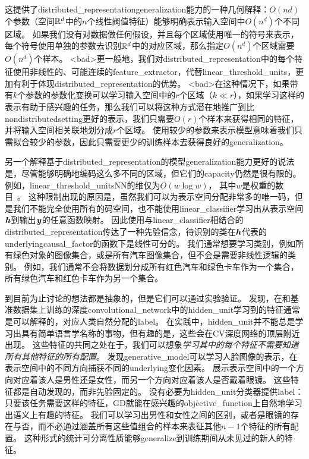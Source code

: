 这提供了\gls{distributed_representation}\gls{generalization}能力的一种几何解释：$O(nd)$个参数（空间$\mathbb{R}^d$中的$n$个线性阀值特征）能够明确表示输入空间中$O(n^d)$个不同区域。
如果我们没有对数据做任何假设，并且每个区域使用唯一的符号来表示，每个符号使用单独的参数去识别$\mathbb{R}^d$中的对应区域，那么指定$O(n^d)$个区域需要$O(n^d)$个样本。
<bad>更一般地，我们对\gls{distributed_representation}中的每个特征使用非线性的、可能连续的\gls{feature_extractor}，代替\gls{linear_threshold_units}，更加有利于体现\gls{distributed_representation}的优势。
<bad>在这种情况下，如果带有$k$个参数的参数化变换可以学习输入空间中的$r$个区域（$k\ll r$），如果学习这样的表示有助于感兴趣的任务，那么我们可以将这种方式潜在地推广到比\gls{nondistributed}\gls{setting}更好的表示，我们只需要$O(r)$个样本来获得相同的特征，并将输入空间相关联地划分成$r$个区域。
使用较少的参数来表示模型意味着我们只需拟合较少的参数，因此只需要更少的训练样本去获得良好的\gls{generalization}。

另一个解释基于\gls{distributed_representation}的模型\gls{generalization}能力更好的说法是，尽管能够明确地编码这么多不同的区域，但它们的\gls{capacity}仍然是很有限的。
例如，\gls{linear_threshold_units}\gls{NN}的维仅为$O(w\log w)$， 其中$w$是权重的数目~\citep{sontag1998vc}。
这种限制出现的原因是，虽然我们可以为表示空间分配非常多的唯一码，但是我们不能完全使用所有的码空间，也不能使用\gls{linear_classifier}学习出从表示空间$\boldsymbol{\mathit{h}}$到输出$\boldsymbol{\mathit{y}}$的任意函数映射。
因此使用与\gls{linear_classifier}相结合的\gls{distributed_representation}传达了一种先验信念，待识别的类在$\boldsymbol{\mathit{h}}$代表的\gls{underlying}\gls{causal_factor}的函数下是线性可分的。
我们通常想要学习类别，例如所有绿色对象的图像集合，或是所有汽车图像集合，但不会是需要非线性逻辑的类别。
例如，我们通常不会将数据划分成所有红色汽车和绿色卡车作为一个集合，所有绿色汽车和红色卡车作为另一个集合。


到目前为止讨论的想法都是抽象的，但是它们可以通过实验验证。
\cite{Zhou-et-al-ICLR2015}发现，在和基准数据集上训练的深度\gls{convolutional_network}中的\gls{hidden_unit}学习到的特征通常是可以解释的，对应人类自然分配的\gls{label}。
在实践中，\gls{hidden_unit}并不能总是学习出具有简单语言学名称的事物，但有趣的是，这些会在\gls{CV}深度网络的顶层附近出现。
这些特征的共同之处在于，我们可以想象\emph{学习其中的每个特征不需要知道所有其他特征的所有配置}。
\cite{radford2015unsupervised}发现\gls{generative_model}可以学习人脸图像的表示，在表示空间中的不同方向捕获不同的\gls{underlying}变化因素。
展示表示空间中的一个方向对应着该人是男性还是女性，而另一个方向对应着该人是否戴着眼镜。
这些特征都是自动发现的，而非先验固定的。
没有必要为\gls{hidden_unit}分类器提供\gls{label}：只要该任务需要这样的特征，\gls{GD}就能在感兴趣的\gls{objective_function}上自然地学习出语义上有趣的特征。
我们可以学习出男性和女性之间的区别，或者是眼镜的存在与否，而不必通过涵盖所有这些值组合的样本来表征其他$n-1$个特征的所有配置。
这种形式的统计可分离性质能够\gls{generalize}到训练期间从未见过的新人的特征。

